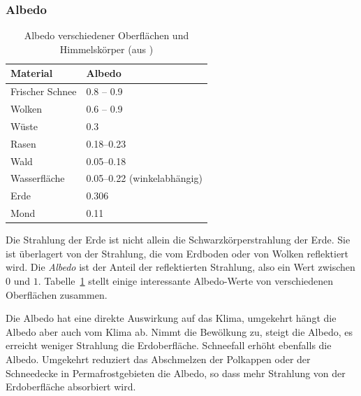 \subsubsection{Albedo}
\begin{table}
\centering
\begin{tabular}{|l|l|}
\hline
Material&Albedo\\
\hline
Frischer Schnee&0.8 -- 0.9\\
Wolken         &0.6 -- 0.9\\
Wüste          &0.3\\
Rasen          &0.18--0.23\\
Wald           &0.05--0.18\\
Wasserfläche   &0.05--0.22 (winkelabhängig)\\
Erde           &0.306 \\
Mond           &0.11 \\
\hline
\end{tabular}
\caption{Albedo verschiedener Oberflächen und Himmelskörper
(aus \cite{skript:albedo})
\label{skript:albedotabelle}}
\end{table}
Die Strahlung der Erde ist nicht allein die Schwarzkörperstrahlung
der Erde.
Sie ist überlagert von der Strahlung, die vom Erdboden oder von
Wolken reflektiert wird.
Die {\em Albedo} ist der Anteil der reflektierten Strahlung, also ein
Wert zwischen $0$ und $1$.
Tabelle~\ref{skript:albedotabelle} stellt einige interessante
Albedo-Werte von verschiedenen Oberflächen zusammen.

Die Albedo hat eine direkte Auswirkung auf das Klima, umgekehrt
hängt die Albedo aber auch vom Klima ab.
Nimmt die Bewölkung zu, steigt die Albedo, es erreicht weniger 
Strahlung die Erdoberfläche.
Schneefall erhöht ebenfalls die Albedo.
Umgekehrt reduziert das Abschmelzen der Polkappen oder der
Schneedecke in Permafrostgebieten die Albedo, so dass mehr Strahlung
von der Erdoberfläche absorbiert wird.

